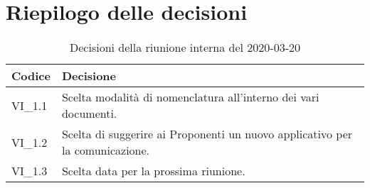 \section{Riepilogo delle decisioni}
\begin{longtable}{ 
	 >{\centering}p{} >{}p{} }
	
	\caption{Decisioni della riunione interna del 2020-03-20}\\	
	
	\textbf{\color{white}Codice} & 
	\textbf{\color{white}Decisione} 
	\tabularnewline  
	\endhead
	
	VI\_1.1 & Scelta modalità di nomenclatura all'interno dei vari documenti. \\
	VI\_1.2 & Scelta di suggerire ai Proponenti un nuovo applicativo per la comunicazione. \\
	VI\_1.3 & Scelta data per la prossima riunione. \\
	
\end{longtable}